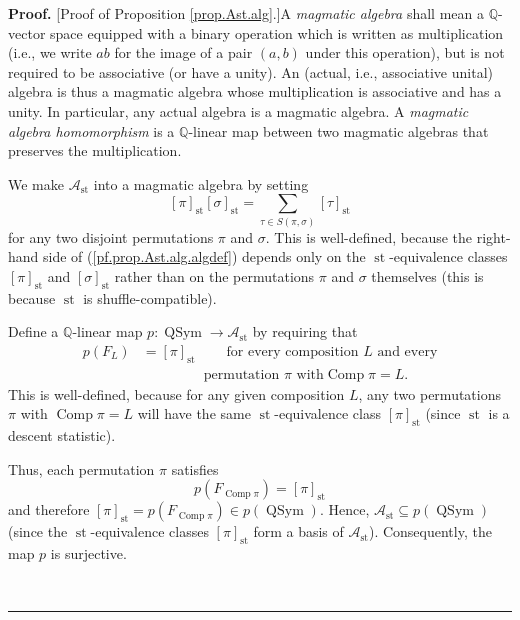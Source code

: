 \documentclass[numbers=enddot,12pt,final,onecolumn,notitlepage]{scrartcl}%
\theoremstyle{definition}
\newenvironment{proof}[1][Proof]{\noindent\textbf{#1.} }{\ \rule{0.5em}{0.5em}}
\let\sumnonlimits\sum
\renewcommand{\sum}{\sumnonlimits\limits}
\begin{document}
\begin{proof}
[Proof of Proposition \ref{prop.Ast.alg}.]A \textit{magmatic algebra} shall
mean a $\mathbb{Q}$-vector space equipped with a binary operation which is
written as multiplication (i.e., we write $ab$ for the image of a pair
$\left(  a,b\right)  $ under this operation), but is not required to be
associative (or have a unity). An (actual, i.e., associative unital) algebra
is thus a magmatic algebra whose multiplication is associative and has a
unity. In particular, any actual algebra is a magmatic algebra. A
\textit{magmatic algebra homomorphism} is a $\mathbb{Q}$-linear map between
two magmatic algebras that preserves the multiplication.

We make $\mathcal{A}_{\operatorname*{st}}$ into a magmatic algebra by setting%
\begin{equation}
\left[  \pi\right]  _{\operatorname*{st}}\left[  \sigma\right]
_{\operatorname*{st}}=\sum_{\tau\in S\left(  \pi,\sigma\right)  }\left[
\tau\right]  _{\operatorname*{st}} \label{pf.prop.Ast.alg.algdef}%
\end{equation}
for any two disjoint permutations $\pi$ and $\sigma$. This is well-defined,
because the right-hand side of (\ref{pf.prop.Ast.alg.algdef}) depends only on
the $\operatorname*{st}$-equivalence classes $\left[  \pi\right]
_{\operatorname*{st}}$ and $\left[  \sigma\right]  _{\operatorname*{st}}$
rather than on the permutations $\pi$ and $\sigma$ themselves (this is because
$\operatorname*{st}$ is shuffle-compatible).

Define a $\mathbb{Q}$-linear map $p:\operatorname*{QSym}\rightarrow
\mathcal{A}_{\operatorname*{st}}$ by requiring that%
\begin{align*}
p\left(  F_{L}\right)   &  =\left[  \pi\right]  _{\operatorname*{st}%
}\ \ \ \ \ \ \ \ \ \ \text{for every composition }L\text{ and every}\\
&  \ \ \ \ \ \ \ \ \ \ \ \ \ \ \ \ \ \ \ \ \text{permutation }\pi\text{ with
}\operatorname*{Comp}\pi=L.
\end{align*}
This is well-defined, because for any given composition $L$, any two
permutations $\pi$ with $\operatorname*{Comp}\pi=L$ will have the same
$\operatorname*{st}$-equivalence class $\left[  \pi\right]
_{\operatorname*{st}}$ (since $\operatorname*{st}$ is a descent statistic).

Thus, each permutation $\pi$ satisfies
\begin{equation}
p\left(  F_{\operatorname*{Comp}\pi}\right)  =\left[  \pi\right]
_{\operatorname*{st}} \label{pf.prop.Ast.alg.pFCp}%
\end{equation}
and therefore $\left[  \pi\right]  _{\operatorname*{st}}=p\left(
F_{\operatorname*{Comp}\pi}\right)  \in p\left(  \operatorname*{QSym}\right)
$. Hence, $\mathcal{A}_{\operatorname*{st}}\subseteq p\left(
\operatorname*{QSym}\right)  $ (since the $\operatorname*{st}$-equivalence
classes $\left[  \pi\right]  _{\operatorname*{st}}$ form a basis of
$\mathcal{A}_{\operatorname*{st}}$). Consequently, the map $p$ is surjective.


\end{proof}
\end{document}

